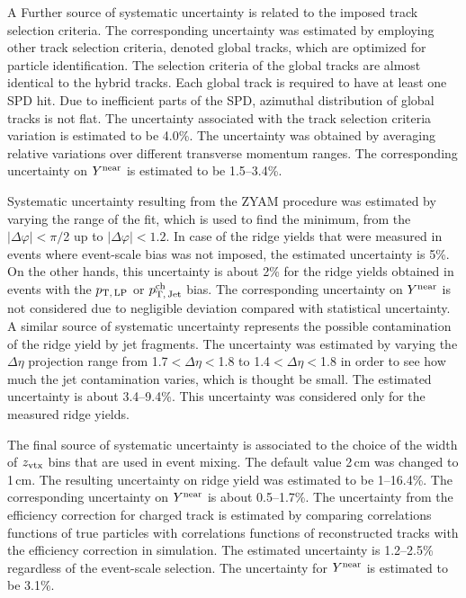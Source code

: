 A Further source of systematic uncertainty is related to the imposed track selection criteria. The corresponding uncertainty was estimated by employing other track selection criteria, denoted global tracks, which are optimized for particle identification. The selection criteria of the global tracks are almost identical to the hybrid tracks. Each global track is required to have at least one SPD hit. 
Due to inefficient parts of the SPD, azimuthal distribution of global tracks is not flat.
The uncertainty associated with the track selection criteria variation is estimated to be 4.0\%. The uncertainty was obtained by averaging relative variations over different transverse momentum ranges. The corresponding uncertainty on $Y^{\rm{near}}$ is estimated to be 1.5--3.4\%.

Systematic uncertainty resulting from the ZYAM procedure was estimated by varying the range of the fit, which is used to find the minimum, from the $|\Delta\varphi|<\pi/$2 up to $|\Delta\varphi|<1.2$. In case of the ridge yields that were measured in events where event-scale bias was not imposed, the estimated uncertainty is 5\%. On the other hands, this uncertainty is about 2\% for the ridge yields obtained in events with the $p_\mathrm{T,\,LP}$ or $p_\mathrm{T,\,Jet}^\mathrm{ch}$ bias. The corresponding uncertainty on $Y^{\rm{near}}$ is not considered due to negligible deviation compared with statistical uncertainty. A similar source of systematic uncertainty represents the possible contamination of the ridge yield by jet fragments. The uncertainty was estimated by varying the $\Delta\eta$ projection range from 1.7$<\Delta\eta<$1.8 to 1.4$<\Delta\eta<$1.8 in order to see how much the jet contamination varies, which is thought be small. The estimated uncertainty is about 3.4--9.4\%. This uncertainty was considered only for the measured ridge yields.


The final source of systematic uncertainty is associated to the choice of the width of $z_{\rm vtx}$ bins that are used in event mixing. The default value 2\,cm was changed to 1\,cm. The resulting uncertainty on ridge yield was estimated to be 1--16.4\%.
The corresponding uncertainty on $Y^{\rm{near}}$ is about 0.5--1.7\%. The uncertainty from the efficiency correction for charged track is estimated by comparing correlations functions of true particles with correlations functions of reconstructed tracks with the efficiency correction in simulation. The estimated uncertainty is 1.2--2.5\% regardless of the event-scale selection. The uncertainty for $Y^{\rm{near}}$ is estimated to be 3.1\%.

